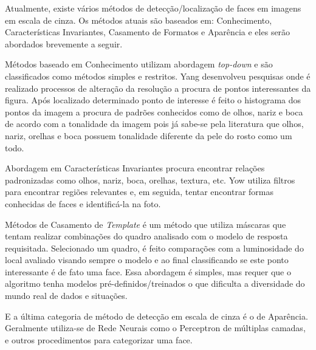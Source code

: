 \documentclass[12pt]{article}
\begin{document}
Atualmente, existe vários métodos de detecção/localização de faces em imagens em escala de cinza. Os métodos atuais são baseados em: Conhecimento, Características Invariantes, Casamento de Formatos e Aparência e eles serão abordados brevemente a seguir.

Métodos baseado em Conhecimento utilizam abordagem \textit{top-down} e são classificados como métodos simples e restritos. Yang \cite{yang1994human} desenvolveu pesquisas onde é realizado processos de alteração da resolução a procura de pontos interessantes da figura. Após localizado determinado ponto de interesse é feito o histograma dos pontos da imagem a procura de padrões conhecidos como de olhos, nariz e boca de acordo com a tonalidade da imagem pois já sabe-se pela literatura que olhos, nariz, orelhas e boca possuem tonalidade diferente da pele do rosto como um todo.

Abordagem em Características Invariantes procura encontrar relações padronizadas como olhos, nariz, boca, orelhas, textura, etc. Yow \cite{yow1996probabilistic} \cite{yow1997feature} utiliza filtros para encontrar regiões relevantes e, em seguida, tentar encontrar formas conhecidas de faces e identificá-la na foto.

Métodos de Casamento de \textit{Template} é um método que utiliza máscaras que tentam realizar combinações do quadro analisado com o modelo de resposta requisitada. Selecionado um quadro, é feito comparações com a luminosidade do local avaliado visando sempre o modelo e ao final classificando se este ponto interessante é de fato uma face. Essa abordagem é simples, mas requer que o algoritmo tenha modelos pré-definidos/treinados o que dificulta a diversidade do mundo real de dados e situações.

E a última categoria de método de detecção em escala de cinza é o de Aparência. Geralmente utiliza-se de Rede Neurais como o Perceptron de múltiplas camadas, e outros procedimentos para categorizar uma face.



\end{document}
